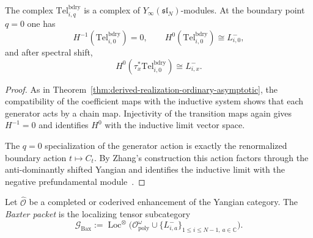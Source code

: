 \begin{theorem}
\ClaimStatusProvedHere
\label{thm:derived-realization-negative-prefundamental}
The complex $\mathrm{Tel}^{\mathrm{bdry}}_{i,q}$ is a complex of
$Y_\infty(\mathfrak{sl}_N)$-modules. At the boundary point $q=0$ one has
\begin{equation}
H^{-1}(\mathrm{Tel}^{\mathrm{bdry}}_{i,0})=0,
\qquad
H^0(\mathrm{Tel}^{\mathrm{bdry}}_{i,0})\cong L^-_{i,0},
\end{equation}
and after spectral shift,
\begin{equation}
H^0(\tau_x^*\mathrm{Tel}^{\mathrm{bdry}}_{i,0})\cong L^-_{i,x}.
\end{equation}
\end{theorem}

\begin{proof}
As in Theorem~\ref{thm:derived-realization-ordinary-asymptotic}, the
compatibility of the coefficient maps with the inductive system shows that
each generator acts by a chain map. Injectivity of the transition maps
again gives $H^{-1}=0$ and identifies $H^0$ with the inductive limit
vector space.

The $q=0$ specialization of the generator action is exactly the renormalized
boundary action $t\mapsto C_t$. By Zhang's construction this action
factors through the anti-dominantly shifted Yangian and identifies the
inductive limit with the negative prefundamental module~\cite{Zhang24}.
\end{proof}

\begin{definition}
\label{def:baxter-packet}
Let $\widehat{\mathcal O}$ be a completed or coderived enhancement of the
Yangian category. The \emph{Baxter packet} is the localizing tensor
subcategory
\begin{equation}
\mathcal G_{\mathrm{Bax}}
:=
\operatorname{Loc}^{\otimes}
\Big(
\mathcal O^{\omega}_{\mathrm{poly}}
\cup
\{L^-_{i,a}\}_{1\le i\le N-1,\,a\in\mathbb C}
\Big).
\end{equation}
\end{definition}

